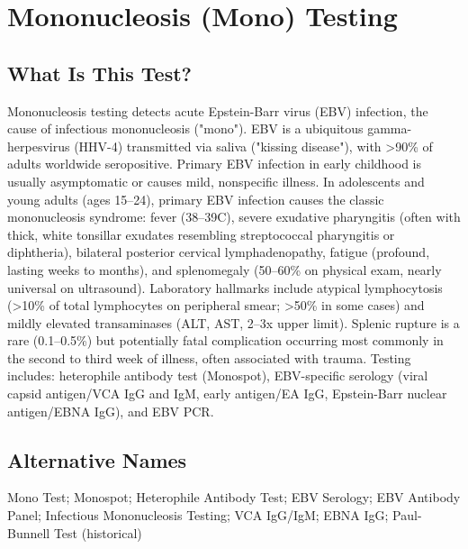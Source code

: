 \chapter{Mononucleosis (Mono) Testing}

\section*{What Is This Test?}
Mononucleosis testing detects acute Epstein-Barr virus (EBV) infection, the cause of infectious mononucleosis ("mono"). EBV is a ubiquitous gamma-herpesvirus (HHV-4) transmitted via saliva ("kissing disease"), with >90\% of adults worldwide seropositive. Primary EBV infection in early childhood is usually asymptomatic or causes mild, nonspecific illness. In adolescents and young adults (ages 15--24), primary EBV infection causes the classic mononucleosis syndrome: fever (38--39\textdegree{}C), severe exudative pharyngitis (often with thick, white tonsillar exudates resembling streptococcal pharyngitis or diphtheria), bilateral posterior cervical lymphadenopathy, fatigue (profound, lasting weeks to months), and splenomegaly (50--60\% on physical exam, nearly universal on ultrasound). Laboratory hallmarks include atypical lymphocytosis (>10\% of total lymphocytes on peripheral smear; >50\% in some cases) and mildly elevated transaminases (ALT, AST, 2--3x upper limit). Splenic rupture is a rare (0.1--0.5\%) but potentially fatal complication occurring most commonly in the second to third week of illness, often associated with trauma. Testing includes: heterophile antibody test (Monospot), EBV-specific serology (viral capsid antigen/VCA IgG and IgM, early antigen/EA IgG, Epstein-Barr nuclear antigen/EBNA IgG), and EBV PCR.

\section*{Alternative Names}
Mono Test; Monospot; Heterophile Antibody Test; EBV Serology; EBV Antibody Panel; Infectious Mononucleosis Testing; VCA IgG/IgM; EBNA IgG; Paul-Bunnell Test (historical)

